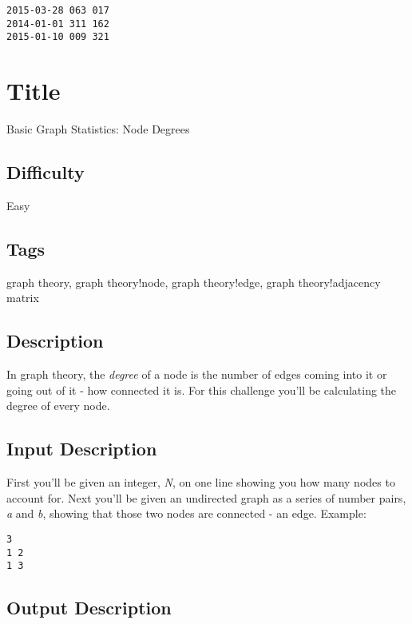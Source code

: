 \begin{verbatim}
2015-03-28 063 017
2014-01-01 311 162
2015-01-10 009 321
\end{verbatim}

\section{Title}\label{title-26}

Basic Graph Statistics: Node Degrees

\subsection{Difficulty}\label{difficulty-25}

Easy

\subsection{Tags}\label{tags-26}

graph theory, graph theory!node, graph theory!edge, graph
theory!adjacency matrix

\subsection{Description}\label{description-26}

In graph theory, the \emph{degree} of a node is the number of edges
coming into it or going out of it - how connected it is. For this
challenge you'll be calculating the degree of every node.

\subsection{Input Description}\label{input-description-18}

First you'll be given an integer, \emph{N}, on one line showing you how
many nodes to account for. Next you'll be given an undirected graph as a
series of number pairs, \emph{a} and \emph{b}, showing that those two
nodes are connected - an edge. Example:

\begin{verbatim}
3 
1 2
1 3
\end{verbatim}

\subsection{Output Description}\label{output-description-19}

